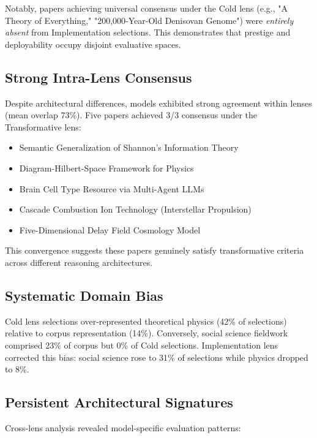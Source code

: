\documentclass{article}
\begin{document}
Notably, papers achieving universal consensus under the Cold lens (e.g., "A Theory of Everything," "200,000-Year-Old Denisovan Genome") were \textit{entirely absent} from Implementation selections. This demonstrates that prestige and deployability occupy disjoint evaluative spaces.

\subsection{Strong Intra-Lens Consensus}

Despite architectural differences, models exhibited strong agreement within lenses (mean overlap 73\%). Five papers achieved 3/3 consensus under the Transformative lens:

\begin{itemize}
    \item Semantic Generalization of Shannon's Information Theory
    \item Diagram-Hilbert-Space Framework for Physics
    \item Brain Cell Type Resource via Multi-Agent LLMs
    \item Cascade Combustion Ion Technology (Interstellar Propulsion)
    \item Five-Dimensional Delay Field Cosmology Model
\end{itemize}

This convergence suggests these papers genuinely satisfy transformative criteria across different reasoning architectures.

\subsection{Systematic Domain Bias}

Cold lens selections over-represented theoretical physics (42\% of selections) relative to corpus representation (14\%). Conversely, social science fieldwork comprised 23\% of corpus but 0\% of Cold selections. Implementation lens corrected this bias: social science rose to 31\% of selections while physics dropped to 8\%.

\subsection{Persistent Architectural Signatures}

Cross-lens analysis revealed model-specific evaluation patterns:
\end{document}

